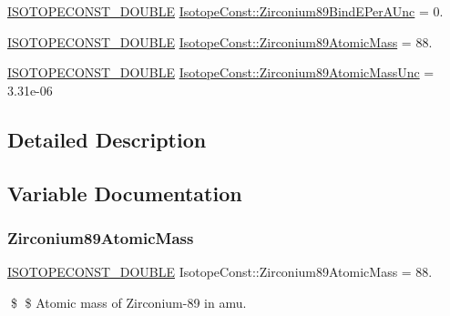 \begin{DoxyCompactItemize}
\mbox{\hyperlink{group___isotope_const-_macros_ga8f45a7272ce02c0b4c65c44636ed719a}{I\+S\+O\+T\+O\+P\+E\+C\+O\+N\+S\+T\+\_\+\+D\+O\+U\+B\+LE}} \mbox{\hyperlink{group___isotope_const-_zirconium-_zr89_ga69f1d85e0049f12e233fde5679200007}{Isotope\+Const\+::\+Zirconium89\+Bind\+E\+Per\+A\+Unc}} = 0.
\item 
\mbox{\hyperlink{group___isotope_const-_macros_ga8f45a7272ce02c0b4c65c44636ed719a}{I\+S\+O\+T\+O\+P\+E\+C\+O\+N\+S\+T\+\_\+\+D\+O\+U\+B\+LE}} \mbox{\hyperlink{group___isotope_const-_zirconium-_zr89_ga2ff10a1dfdd4bc82300dadfe699c8058}{Isotope\+Const\+::\+Zirconium89\+Atomic\+Mass}} = 88.
\item 
\mbox{\hyperlink{group___isotope_const-_macros_ga8f45a7272ce02c0b4c65c44636ed719a}{I\+S\+O\+T\+O\+P\+E\+C\+O\+N\+S\+T\+\_\+\+D\+O\+U\+B\+LE}} \mbox{\hyperlink{group___isotope_const-_zirconium-_zr89_gadf9fb29de48a3a5b0990493c15a1bcad}{Isotope\+Const\+::\+Zirconium89\+Atomic\+Mass\+Unc}} = 3.\+31e-\/06
\end{DoxyCompactItemize}


\subsection{Detailed Description}


\subsection{Variable Documentation}
\mbox{\label{group___isotope_const-_zirconium-_zr89_ga2ff10a1dfdd4bc82300dadfe699c8058}} 
\subsubsection{\texorpdfstring{Zirconium89\+Atomic\+Mass}{Zirconium89AtomicMass}}
{\footnotesize\ttfamily \mbox{\hyperlink{group___isotope_const-_macros_ga8f45a7272ce02c0b4c65c44636ed719a}{I\+S\+O\+T\+O\+P\+E\+C\+O\+N\+S\+T\+\_\+\+D\+O\+U\+B\+LE}} Isotope\+Const\+::\+Zirconium89\+Atomic\+Mass = 88.}

\$ \$ Atomic mass of Zirconium-\/89 in amu. \mbox{\label{group___isotope_const-_zirconium-_zr89_gadf9fb29de48a3a5b0990493c15a1bcad}} 
